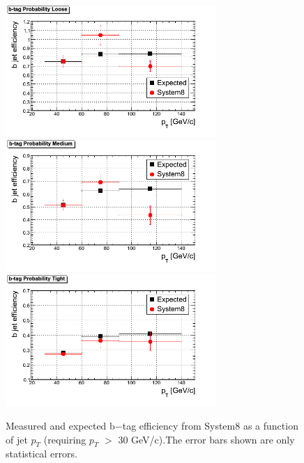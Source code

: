 \begin{figure}[htbp]
  \begin{center}
    \includegraphics[width=80mm]{Figures/JPL_Tag.png}
    \includegraphics[width=80mm]{Figures/JPM_Tag.png}
    \includegraphics[width=80mm]{Figures/JPT_Tag.png}
  \end{center}
  \caption{Measured and expected b$-$tag efficiency from System8 as a function of jet $p_T $ (requiring $p_T $ $> $ 30 GeV/c).The error bars shown are only statistical errors.}
  \label{fig:S8_JP_results}
\end{figure}

\clearpage


